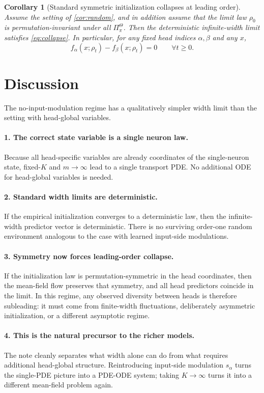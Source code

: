 \documentclass[11pt]{article}
\newtheorem{corollary}[theorem]{Corollary}
\theoremstyle{definition}
\begin{document}
\begin{corollary}[Standard symmetric initialization collapses at leading order]
\label{cor:collapse}
Assume the setting of \cref{cor:random}, and in addition assume that the limit
law $\rho_0$ is permutation-invariant under all $\Pi_\pi^\Theta$. Then the
deterministic infinite-width limit satisfies \eqref{eq:collapse}. In particular,
for any fixed head indices $\alpha,\beta$ and any $x$,
\[
  f_\alpha(x;\rho_t)-f_\beta(x;\rho_t)=0
  \qquad
  \forall t\ge 0.
\]
\end{corollary}

\section{Discussion}

The no-input-modulation regime has a qualitatively simpler width limit than the
setting with head-global variables.

\paragraph{1. The correct state variable is a single neuron law.}
Because all head-specific variables are already coordinates of the single-neuron
state, fixed-$K$ and $m\to\infty$ lead to a single transport PDE. No additional
ODE for head-global variables is needed.

\paragraph{2. Standard width limits are deterministic.}
If the empirical initialization converges to a deterministic law, then the
infinite-width predictor vector is deterministic. There is no surviving
order-one random environment analogous to the case with learned input-side
modulations.

\paragraph{3. Symmetry now forces leading-order collapse.}
If the initialization law is permutation-symmetric in the head coordinates, then
the mean-field flow preserves that symmetry, and all head predictors coincide in
the limit. In this regime, any observed diversity between heads is therefore
subleading: it must come from finite-width fluctuations, deliberately asymmetric
initialization, or a different asymptotic regime.

\paragraph{4. This is the natural precursor to the richer models.}
The note cleanly separates what width alone can do from what requires additional
head-global structure. Reintroducing input-side modulation $s_\alpha$ turns the
single-PDE picture into a PDE-ODE system; taking $K\to\infty$ turns it into a
different mean-field problem again.
\end{document}
